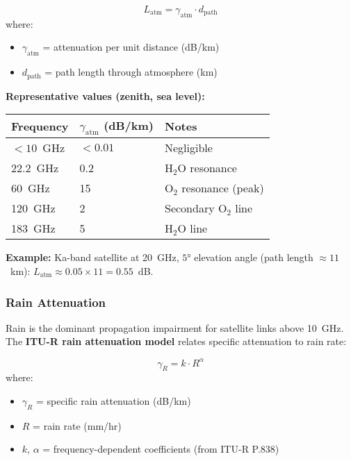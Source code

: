 \begin{equation}
\label{eq:atm_loss}
L_{\text{atm}} = \gamma_{\text{atm}} \cdot d_{\text{path}}
\end{equation}
where:
\begin{itemize}
\item $\gamma_{\text{atm}}$ = attenuation per unit distance (dB/km)
\item $d_{\text{path}}$ = path length through atmosphere (km)
\end{itemize}

\textbf{Representative values (zenith, sea level):}

\begin{center}
\begin{tabular}{@{}lll@{}}
\toprule
Frequency & $\gamma_{\text{atm}}$ (dB/km) & Notes \\
\midrule
$< 10$~GHz & $< 0.01$ & Negligible \\
22.2~GHz & 0.2 & H$_2$O resonance \\
60~GHz & 15 & O$_2$ resonance (peak) \\
120~GHz & 2 & Secondary O$_2$ line \\
183~GHz & 5 & H$_2$O line \\
\bottomrule
\end{tabular}
\end{center}

\textbf{Example:} Ka-band satellite at 20~GHz, $5°$ elevation angle (path length $\approx 11$~km): $L_{\text{atm}} \approx 0.05 \times 11 = 0.55$~dB.

\subsubsection{Rain Attenuation}

Rain is the dominant propagation impairment for satellite links above 10~GHz. The \textbf{ITU-R rain attenuation model} relates specific attenuation to rain rate:

\begin{equation}
\label{eq:rain_specific}
\gamma_R = k \cdot R^{\alpha}
\end{equation}
where:
\begin{itemize}
\item $\gamma_R$ = specific rain attenuation (dB/km)
\item $R$ = rain rate (mm/hr)
\item $k$, $\alpha$ = frequency-dependent coefficients (from ITU-R P.838)
\end{itemize}

